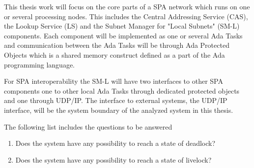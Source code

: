 


This thesis work will focus on the core parts of a SPA network which runs on
one or several processing nodes. This includes the Central Addressing Service
(CAS), the Lookup Service (LS) and the Subnet Manager for "Local Subnets"
(SM-L) components. Each component will be implemented as one or several Ada
Tasks and communication between the Ada Tasks will be through Ada Protected
Objects which is a shared memory construct defined as a part of the Ada
programming language.

For SPA interoperability the SM-L will have two interfaces to other SPA
components one to other local Ada Tasks through dedicated protected objects and
one through UDP/IP. The interface to external systems, the UDP/IP interface,
will be the system boundary of the analyzed system in this thesis.


The following list includes the questions to be answered
\begin{enumerate}
    \item Does the system have any possibility to reach a state of deadlock?
    \item Does the system have any possibility to reach a state of livelock?
\end{enumerate}

